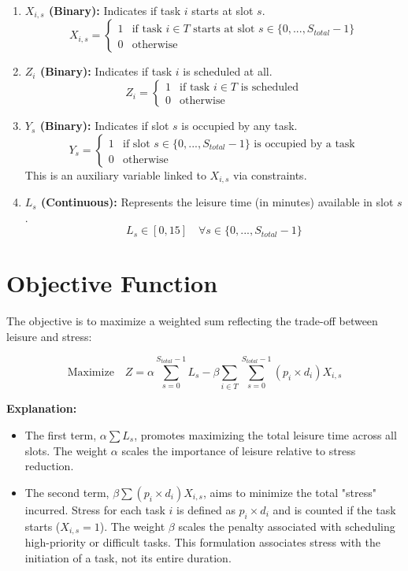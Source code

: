\documentclass{article}
\begin{document}
\begin{enumerate}
    \item \textbf{$X_{i,s}$ (Binary):} Indicates if task $i$ starts at slot $s$.
    \[ X_{i,s} = \begin{cases} 1 & \text{if task } i \in T \text{ starts at slot } s \in \{0, ..., S_{total}-1\} \\ 0 & \text{otherwise} \end{cases} \]

    \item \textbf{$Z_{i}$ (Binary):} Indicates if task $i$ is scheduled at all.
    \[ Z_{i} = \begin{cases} 1 & \text{if task } i \in T \text{ is scheduled} \\ 0 & \text{otherwise} \end{cases} \]
    
    \item \textbf{$Y_{s}$ (Binary):} Indicates if slot $s$ is occupied by any task.
    \[ Y_{s} = \begin{cases} 1 & \text{if slot } s \in \{0, ..., S_{total}-1\} \text{ is occupied by a task} \\ 0 & \text{otherwise} \end{cases} \]
    This is an auxiliary variable linked to $X_{i,s}$ via constraints.

    \item \textbf{$L_{s}$ (Continuous):} Represents the leisure time (in minutes) available in slot $s$.
    \[ L_{s} \in [0, 15] \quad \forall s \in \{0, ..., S_{total}-1\} \]
\end{enumerate}

\section{Objective Function}

The objective is to maximize a weighted sum reflecting the trade-off between leisure and stress:

\[
\text{Maximize} \quad Z = \alpha \sum_{s=0}^{S_{total}-1} L_s - \beta \sum_{i \in T} \sum_{s=0}^{S_{total}-1} (p_i \times d_i) X_{i,s}
\]

\textbf{Explanation:}
\begin{itemize}
    \item The first term, $\alpha \sum L_s$, promotes maximizing the total leisure time across all slots. The weight $\alpha$ scales the importance of leisure relative to stress reduction.
    \item The second term, $\beta \sum (p_i \times d_i) X_{i,s}$, aims to minimize the total "stress" incurred. Stress for each task $i$ is defined as $p_i \times d_i$ and is counted if the task starts ($X_{i,s}=1$). The weight $\beta$ scales the penalty associated with scheduling high-priority or difficult tasks. This formulation associates stress with the initiation of a task, not its entire duration.
\end{itemize}
\end{document}
